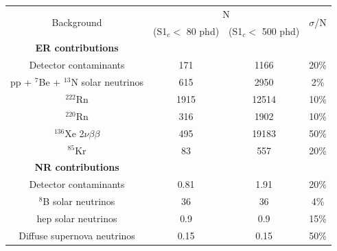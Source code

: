 \begin{table}[]
    \centering
    \begin{tabular}{c|c|c|c}
        \multirow{2}{*}{Background}                  & \multicolumn{2}{c}{N}                            & \multirow{2}{*}{$\sigma$/N}  \\ 
                                                     &  (S1$_c <$ 80 phd)     & (S1$_c <$ 500 phd)      &              \\ \hline
        \textbf{ER contributions}                    &                        &                         &   \\
        Detector contaminants                        & 171                    & 1166                    & 20\% \cite{LZ_projected_sensitivity_paper_ref}        \\
        pp + ${}^{7}$Be + ${}^{13}$N solar neutrinos & 615                    & 2950                    & 2\% \cite{pp_solar_neutrinos_rate_ref}       \\
        ${}^{222}$Rn                                 & 1915                   & 12514                   & 10\% \cite{lz_predicted_radon_rate_ref}        \\
        ${}^{220}$Rn                                 & 316                    & 1902                    & 10\% \cite{lz_predicted_radon_rate_ref}        \\
        ${}^{136}$Xe 2$\nu\beta\beta$                & 495                    & 19183                   & 50\% \cite{double_beta_decay_rate_ref}        \\
        ${}^{85}$Kr                                  & 83                     & 557                     & 20\% \cite{kr85_rate_ref}         \\ \hline
        \textbf{NR contributions}                    &                        &                         &   \\
        Detector contaminants                        & 0.81                   & 1.91                    & 20\% \cite{LZ_projected_sensitivity_paper_ref}         \\
        ${}^{8}$B solar neutrinos                    & 36                     & 36                      & 4\%  \cite{b8_neutrino_rate_ref}       \\
        hep solar neutrinos                          & 0.9                    & 0.9                     & 15\% \cite{solar_neutrinos_rate_ref, pp_solar_neutrinos_rate_ref}        \\
        Diffuse supernova neutrinos                  & 0.15                   & 0.15                    & 50\% \cite{dissuse_supernova_neutrinos_rate_ref}        \\

\end{tabular}
\end{table}
